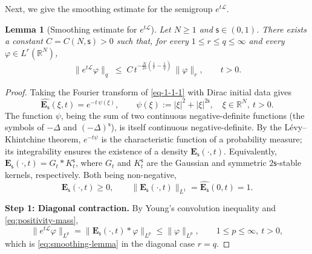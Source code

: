 \documentclass[12pt,reqno]{amsart}
\theoremstyle{plain}
\newtheorem{lem}[thm]{Lemma}
\theoremstyle{definition}
\theoremstyle{remark}
\numberwithin{equation}{section}
\newcommand{\ts}{\mathsf{s}}
\begin{document}
Next, we give the smoothing estimate for the semigroup $e^{t\mathscr{L}}$.

\begin{lem}[Smoothing estimate for $e^{t\mathscr{L}}$]\label{lem:smoothing}
Let $N\geq 1$ and $\ts\in(0,1)$. There exists a constant $C=C(N,\ts)>0$ such that, for every $1\leq r\leq q\leq\infty$ and every $\varphi\in L^{r}(\mathbb{R}^{N})$,
\begin{equation}\label{eq:smoothing-lemma}
\bigl\|e^{t\mathscr{L}}\varphi\bigr\|_{q}
\;\leq\; C\,t^{-\frac{N}{2s}\left(\frac{1}{r}-\frac{1}{q}\right)}\,
\|\varphi\|_{r},\qquad t>0.
\end{equation}
\end{lem}

\begin{proof}
Taking the Fourier transform of \eqref{eq-1-1-1} with Dirac initial data gives
\begin{equation}\label{eq:fourier-kernel}
\widehat{\mathbf{E}_{\ts}}(\xi,t)=e^{-t\,\psi(\xi)},\qquad
\psi(\xi):=|\xi|^{2}+|\xi|^{2\ts},\quad \xi\in\mathbb{R}^{N},\ t>0.
\end{equation}
The function $\psi$, being the sum of two continuous negative-definite functions (the symbols of $-\Delta$ and $(-\Delta)^{\ts}$), is itself continuous negative-definite. By the L\'evy--Khintchine theorem, $e^{-t\psi}$ is the characteristic function of a probability measure; its integrability ensures the existence of a density $\mathbf{E}_{\ts}(\cdot,t)$. Equivalently, $\mathbf{E}_{\ts}(\cdot,t)=G_{t}\ast K_{t}^{\ts}$, where $G_{t}$ and $K_{t}^{\ts}$ are the Gaussian and symmetric $2\ts$-stable kernels, respectively. Both being non-negative,
\begin{equation}\label{eq:positivity-mass}
\mathbf{E}_{\ts}(\cdot,t)\geq 0,\qquad
\|\mathbf{E}_{\ts}(\cdot,t)\|_{L^{1}}=\widehat{\mathbf{E}_{\ts}}(0,t)=1.
\end{equation}

\medskip
\noindent\textbf{Step 1: Diagonal contraction.}
By Young's convolution inequality and \eqref{eq:positivity-mass},
\begin{equation}\label{eq:contraction}
\|e^{t\mathscr{L}}\varphi\|_{L^{p}}
=\|\mathbf{E}_{\ts}(\cdot,t)\ast\varphi\|_{L^{p}}
\leq\|\varphi\|_{L^{p}},
\qquad 1\leq p\leq\infty,\ t>0,
\end{equation}
which is \eqref{eq:smoothing-lemma} in the diagonal case $r=q$.


\end{proof}
\end{document}
